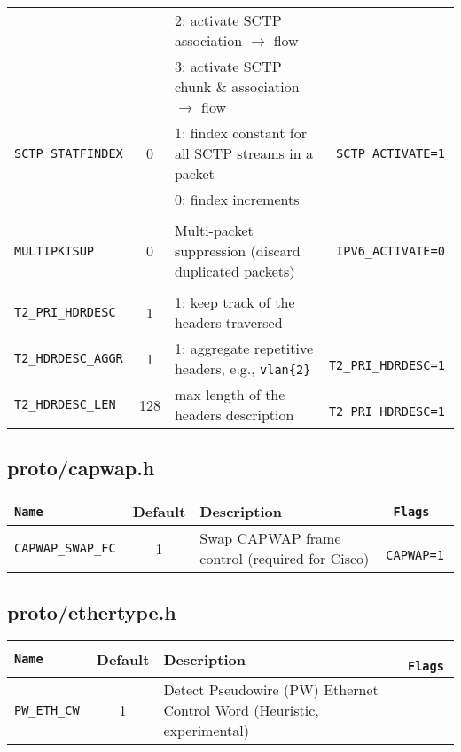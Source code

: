 \begin{longtable}{>{\tt}lcl>{\tt\small}l}
                      &     & 2: activate SCTP association $\rightarrow$ flow        & \\
                      &     & 3: activate SCTP chunk \& association $\rightarrow$ flow & \\
    SCTP\_STATFINDEX  &   0 & 1: findex constant for all SCTP streams in a packet    & SCTP\_ACTIVATE=1\\
                      &     & 0: findex increments                                   & \\
    \\
    MULTIPKTSUP       &   0 & Multi-packet suppression (discard duplicated packets)  & IPV6\_ACTIVATE=0\\
    \\
    T2\_PRI\_HDRDESC  &   1 & 1: keep track of the headers traversed                 & \\
    T2\_HDRDESC\_AGGR &   1 & 1: aggregate repetitive headers, e.g., {\tt vlan\{2\}} & T2\_PRI\_HDRDESC=1\\
    T2\_HDRDESC\_LEN  & 128 & max length of the headers description                  & T2\_PRI\_HDRDESC=1\\
    \bottomrule
\end{longtable}

\subsection{proto/capwap.h}\label{proto-capwap.h}
\begin{longtable}{>{\tt}lcl>{\tt\small}l}
    \toprule
    {\bf Name} & {\bf Default} & {\bf Description} & {\bf Flags}\\
    \midrule\endhead%
    CAPWAP\_SWAP\_FC & 1 & Swap CAPWAP frame control (required for Cisco) & CAPWAP=1\\
    \bottomrule
\end{longtable}

\subsection{proto/ethertype.h}\label{proto-ethertype.h}
\begin{longtable}{>{\tt}lcl>{\tt\small}l}
    \toprule
    {\bf Name} & {\bf Default} & {\bf Description} & {\bf Flags}\\
    \midrule\endhead%
    PW\_ETH\_CW & 1 & Detect Pseudowire (PW) Ethernet Control Word (Heuristic, experimental) & \\
    \bottomrule
\end{longtable}

